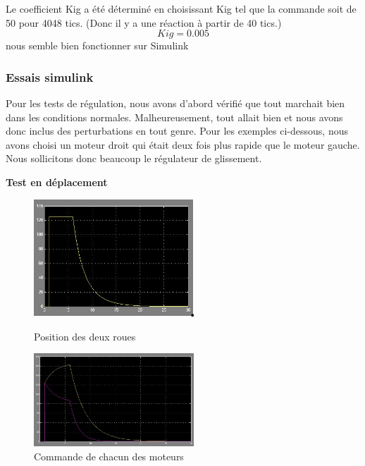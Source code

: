 \noindent Le coefficient Kig a été déterminé en choisissant Kig tel que la commande soit de 50 pour 4048 tics. (Donc il y a une réaction à partir de 40 tics.) $$Kig = 0.005$$ nous semble bien fonctionner sur Simulink

\subsubsection{Essais simulink}
Pour les tests de régulation, nous avons d'abord vérifié que tout marchait bien dans les conditions normales. Malheureusement, tout allait bien et nous avons donc inclus des perturbations en tout genre. Pour les exemples ci-dessous, nous avons choisi un moteur droit qui était deux fois plus rapide que le moteur gauche. Nous sollicitons donc beaucoup le régulateur de glissement.\\

\begin{center}
\textbf{Test en déplacement}
\end{center}

\begin{figure}[ht!]
    \begin{minipage}[b]{0.4\linewidth}
        \centering 
        \includegraphics[width=6cm]{deplCMD.jpg}
        \caption{Position des deux roues}
    \end{minipage}\hfill
    \begin{minipage}[b]{0.48\linewidth}
        \centering \includegraphics[width=6cm]{deplCMDindiv.JPG}
        \caption{Commande de chacun des moteurs}
    \end{minipage}
\end{figure}

